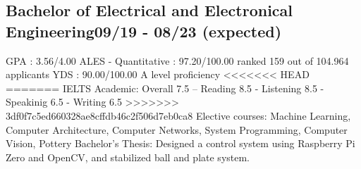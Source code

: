 \vspace*{10pt}
\subsection{{Bachelor of Electrical and Electronical Engineering}\hfill 09/19 - 08/23 (expected)}
\vspace*{5pt}
GPA : 3.56/4.00 \newline
ALES - Quantitative : 97.20/100.00 \hfill ranked 159 out of 104.964 applicants \newline
YDS : 90.00/100.00 \hfill A level proficiency \newline
<<<<<<< HEAD
=======
IELTS Academic: Overall 7.5 -- Reading 8.5 - Listening 8.5 - Speakinig 6.5 - Writing 6.5 \newline
>>>>>>> 3df0f7c5ed660328ae8cffdb46c2f506d7eb0ca8
Elective courses: Machine Learning, Computer Architecture, Computer Networks, System Programming, Computer Vision, Pottery \newline
Bachelor's Thesis: Designed a control system using Raspberry Pi Zero and OpenCV, and stabilized ball and plate system.
